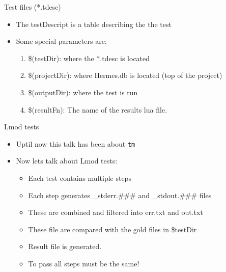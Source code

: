 \documentclass{beamer}
\begin{document}
\begin{frame}{Test files (*.tdesc)}
  \begin{itemize}
    \item The testDescript is a table describing the the test
    \item Some special parameters are:
      \begin{enumerate}
        \item \$(testDir): where the *.tdesc is located
        \item \$(projectDir): where Hermes.db is located (top of the
          project)
        \item \$(outputDir): where the test is run
        \item \$(resultFn): The name of the results lua file.
      \end{enumerate}
  \end{itemize}
\end{frame}

\begin{frame}{Lmod tests}
  \begin{itemize}
    \item Uptil now this talk has been about \texttt{tm}
    \item Now lets talk about Lmod tests:
      \begin{itemize}
        \item Each test contains multiple steps
        \item Each step generates \_stderr.\#\#\# and \_stdout.\#\#\# files
        \item These are combined and filtered into err.txt and out.txt
        \item These file are compared with the gold files in \$testDir
        \item Result file is generated.
        \item To pass all steps must be the same!
      \end{itemize}
  \end{itemize}
\end{frame}
\end{document}
